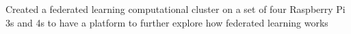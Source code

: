 \documentclass[letterpaper]{resume}
\begin{document}
\begin{compactitem}
\item Created a federated learning computational cluster on a set of four Raspberry Pi 3s and 4s to have a platform to further explore how federated learning works
\end{compactitem}
 


\end{document}
